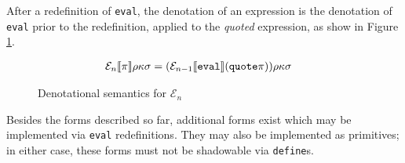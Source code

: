 After a redefinition of \texttt{eval}, the denotation of an expression is the
denotation of \texttt{eval} prior to the redefinition, applied to the
\emph{quoted} expression, as show in Figure \ref{f:denotationalsemn}.

\begin{figure}[H]
\begin{align*}
  \mathcal{E}_{n} \llbracket \pi \rrbracket \rho \kappa \sigma &= (\mathcal{E}_{n-1} \llbracket \text{\texttt{eval}} \rrbracket  (\text{\texttt{quote}} \pi))\rho\kappa\sigma 
\end{align*}
\caption{Denotational semantics for $\mathcal{E}_{n}$}
\label{f:denotationalsemn}
\end{figure}

Besides the forms described so far, additional forms exist which may be
implemented via \texttt{eval} redefinitions. They may also be implemented as
primitives; in either case, these forms must not be shadowable via
\texttt{define}s.
